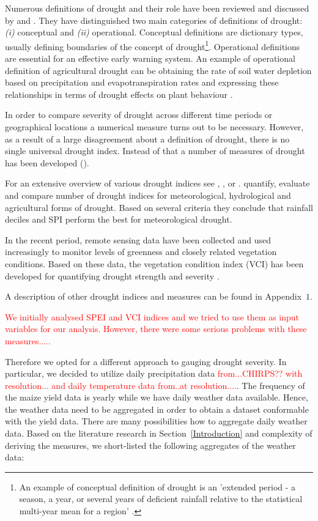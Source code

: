 \documentclass[a4paper,12pt]{article}
\begin{document}
Numerous definitions of drought and their role have been reviewed and discussed by \cite{wilhite1985} and \cite{wilhite2000}. They have distinguished two main categories of definitions of drought: \textit{(i)} conceptual and \textit{(ii)} operational. Conceptual definitions are dictionary types, usually defining boundaries of the concept of drought\footnote{An example of conceptual definition of drought is an 'extended period - a season, a year, or several years of deficient rainfall relative to the statistical multi-year mean for a region' \cite{schneider1996}.}. Operational definitions are essential for an effective early warning system. An example of operational definition of agricultural drought can be obtaining the rate of soil water depletion based on precipitation and evapotranspiration rates and expressing these relationships in terms of drought effects on plant behaviour \citep{wilhite2000}.

In order to compare severity of drought across different time periods or geographical locations a numerical measure turns out to be necessary. However, as a result of a large disagreement about a definition of drought, there is no single universal drought index. Instead of that a number of measures of drought has been developed (\citealp{Heim2002, wilhite1985, wilhite2000}).


For an extensive overview of various drought indices see \cite{Heim2002}, \cite{monacelli2005}, \cite{svoboda2016} or \cite{zargar2011}. \cite{keyantash2002} quantify, evaluate and compare number of drought indices for meteorological, hydrological and agricultural forms of drought. Based on several criteria they conclude that rainfall deciles and SPI perform the best for meteorological drought.

In the recent period, remote sensing data have been collected and used increasingly to monitor levels of greenness and closely related vegetation conditions. Based on these data, the vegetation condition index (VCI) has been developed for quantifying drought strength and severity \citep{KlischAtz2016}.

A description of other drought indices and measures can be found in Appendix~$1$.

\textcolor{red}{We initially analysed SPEI and VCI indices and we tried to use them as input variables for our analysis. However, there were some serious problems with these measures.....}

Therefore we opted for a different approach to gauging drought severity. In particular, we decided to utilize daily precipitation data \textcolor{red}{from...CHIRPS?? with resolution... and daily temperature data from..at resolution....}. The frequency  of the maize yield data is yearly while we have daily weather data available. Hence, the weather data need to be aggregated in order to obtain a dataset conformable with the yield data. There are many possibilities how to aggregate daily weather data. Based on the literature research in Section~\ref{Introduction} and complexity of deriving the measures, we short-listed the following aggregates of the weather data:
\end{document}
